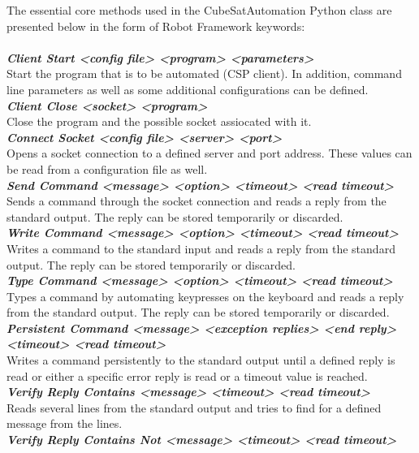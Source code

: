 \documentclass[english,12pt,a4paper,pdftex,elec,utf8]{aaltothesis}
\begin{document}
The essential core methods used in the CubeSatAutomation Python class are presented below in the form of Robot Framework keywords:
\\
\\
\textit{\textbf{Client Start  <config file> <program> <parameters>}}\\
Start the program that is to be automated (CSP client). In addition, command line parameters as well as some additional configurations can be defined.\\
\textit{\textbf{Client Close <socket> <program>}}\\
Close the program and the possible socket assiocated with it.\\
\textit{\textbf{Connect Socket <config file> <server> <port>}}\\
Opens a socket connection to a defined server and port address. These values can be read from a configuration file as well.\\
\textit{\textbf{Send Command  <message> <option> <timeout> <read timeout>}}\\
Sends a command through the socket connection and reads a reply from the standard output. The reply can be stored temporarily or discarded.\\
\textit{\textbf{Write Command  <message> <option> <timeout> <read timeout>}}\\
Writes a command to the standard input and reads a reply from the standard output. The reply can be stored temporarily or discarded.\\
\textit{\textbf{Type Command  <message> <option> <timeout> <read timeout>}}\\
Types a command by automating keypresses on the keyboard and reads a reply from the standard output. The reply can be stored temporarily or discarded. \\
\textit{\textbf{Persistent Command  <message> <exception replies> <end reply> <timeout> <read timeout>}}\\
Writes a command persistently to the standard output until a defined reply is read or either a specific error reply is read or a timeout value is reached.\\
\textit{\textbf{Verify Reply Contains  <message> <timeout> <read timeout>}}\\
Reads several lines from the standard output and tries to find for a defined message from the lines.\\
\textit{\textbf{Verify Reply Contains Not  <message> <timeout> <read timeout>}}\\
\end{document}
